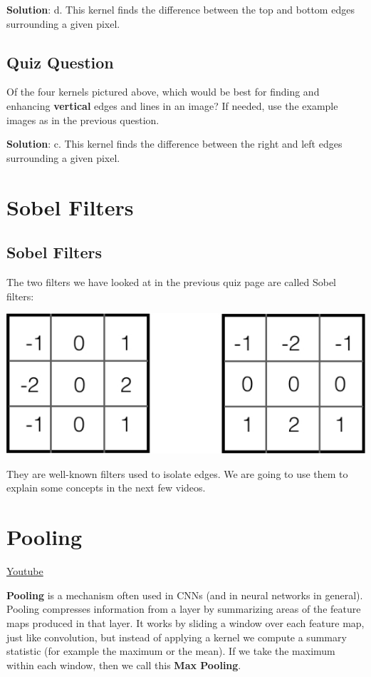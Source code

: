 \textbf{Solution}: d. This kernel finds the difference between the top and bottom edges surrounding a given pixel.

\subsection{Quiz Question}

Of the four kernels pictured above, which would be best for finding and enhancing \textbf{vertical} edges and lines in an image? If needed, use the example images as in the previous question. \newline

\textbf{Solution}: c. This kernel finds the difference between the right and left edges surrounding a given pixel.

\section{Sobel Filters}

\subsection{Sobel Filters}

The two filters we have looked at in the previous quiz page are called Sobel filters:

\includegraphics[width=0.75\linewidth]{img//cnn//concepts/sobel.jpeg}

They are well-known filters used to isolate edges. We are going to use them to explain some concepts in the next few videos.


\section{Pooling}
\href{https://www.youtube.com/watch?v=axWnheBa70E&ab_channel=Udacity}{Youtube} \newline

\textbf{Pooling} is a mechanism often used in CNNs (and in neural networks in general). Pooling compresses information from a layer by summarizing areas of the feature maps produced in that layer. It works by sliding a window over each feature map, just like convolution, but instead of applying a kernel we compute a summary statistic (for example the maximum or the mean). If we take the maximum within each window, then we call this \textbf{Max Pooling}.

